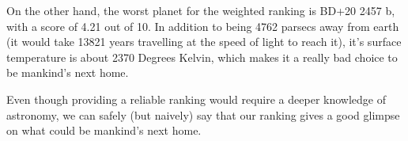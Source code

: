 \documentclass[12p]{article}
\begin{document}
On the other hand, the worst planet for the weighted ranking 
is BD+20 2457 b, with a score of 4.21 out of 10. In addition to being 4762 parsecs away from earth (it would take 13821 years travelling at the speed of light to reach it), it's surface temperature is about 2370 Degrees Kelvin, which makes it a really bad choice to be mankind's next home.

Even though providing a reliable ranking would require a deeper knowledge of astronomy, we can safely (but naively) say that our ranking gives a good glimpse on what could be mankind's next home.


\printbibliography

\appendix
\begin{landscape}

\end{landscape}
\end{document}
